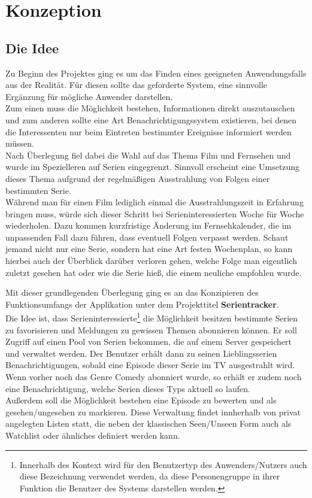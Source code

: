 
\chapter{Konzeption}

\section{Die Idee}

Zu Beginn des Projektes ging es um das Finden eines geeigneten Anwendungsfalls aus der Realität. Für diesen sollte das geforderte System, eine sinnvolle Ergänzung für mögliche Anwender darstellen.\\
Zum einen muss die Möglichkeit bestehen, Informationen direkt auszutauschen und zum anderen sollte eine Art Benachrichtigungssystem existieren, bei denen die Interessenten nur beim Eintreten bestimmter Ereignisse informiert werden müssen.\\
Nach Überlegung fiel dabei die Wahl auf das Thema Film und Fernsehen und wurde im Spezielleren auf Serien eingegrenzt. Sinnvoll erscheint eine Umsetzung dieses Thema aufgrund der regelmäßigen Ausstrahlung von Folgen einer bestimmten Serie.\\
Während man für einen Film lediglich einmal die Ausstrahlungszeit in Erfahrung bringen muss, würde sich dieser Schritt bei Serieninteressierten Woche für Woche wiederholen. Dazu kommen kurzfristige Änderung im Fernsehkalender, die im unpassenden Fall dazu führen, dass eventuell Folgen verpasst werden. Schaut jemand nicht nur eine Serie, sondern hat eine Art festen Wochenplan, so kann hierbei auch der Überblick darüber verloren gehen, welche Folge man eigentlich zuletzt gesehen hat oder wie die Serie hieß, die einem neuliche empfohlen wurde.

\vspace{0.2cm}

Mit dieser grundlegenden Überlegung ging es an das Konzipieren des Funktionsumfangs der Applikation unter dem Projekttitel \textbf{Serientracker}.\\
Die Idee ist, dass Serieninteressierte\footnote[1]{Innerhalb des Kontext wird für den Benutzertyp des Anwenders/Nutzers auch diese Bezeichnung verwendet werden, da diese Personengruppe in ihrer Funktion die Benutzer des Systems darstellen werden.} die Möglichkeit besitzen bestimmte Serien zu favorisieren und Meldungen zu gewissen Themen abonnieren können. Er soll Zugriff auf einen Pool von Serien bekommen, die auf einem Server gespeichert und verwaltet werden. Der Benutzer erhält dann zu seinen Lieblingsserien Benachrichtigungen, sobald eine Episode dieser Serie im TV ausgestrahlt wird. Wenn vorher noch das Genre Comedy abonniert wurde, so erhält er zudem noch eine Benachrichtigung, welche Serien dieses Typs aktuell so laufen.\\
Außerdem soll die Möglichkeit bestehen eine Episode zu bewerten und als gesehen/ungesehen zu markieren. Diese Verwaltung findet innherhalb von privat angelegten Listen statt, die neben der klassischen Seen/Unseen Form auch als Watchlist oder ähnliches definiert werden kann.

